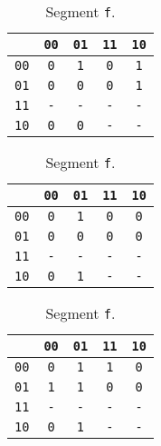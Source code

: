 \documentclass[10pt,a4paper]{article}
\newcommand{\f}[1]{\texttt{#1}}
\begin{document}
\begin{table}[!ht]
  \centering
  \begin{minipage}{0.3\linewidth}
    \centering
    \begin{tabular}{c|cccc}
             & \f{00} & \f{01} & \f{11} & \f{10} \\
      \midrule
      \f{00} &  \f{0} &  \f{1} &  \f{0} &  \f{1} \\
      \f{01} &  \f{0} &  \f{0} &  \f{0} &  \f{1} \\
      \f{11} &  \f{-} &  \f{-} &  \f{-} &  \f{-} \\
      \f{10} &  \f{0} &  \f{0} &  \f{-} &  \f{-} \\
    \end{tabular}
    \caption{Segment \f{d}.}
  \end{minipage}
  \quad
  \begin{minipage}{0.3\linewidth}
    \centering
    \begin{tabular}{c|cccc}
              & \f{00} & \f{01} & \f{11} & \f{10} \\
      \midrule
      \f{00} &  \f{0} &  \f{1} &  \f{0} &  \f{0} \\
      \f{01} &  \f{0} &  \f{0} &  \f{0} &  \f{0} \\
      \f{11} &  \f{-} &  \f{-} &  \f{-} &  \f{-} \\
      \f{10} &  \f{0} &  \f{1} &  \f{-} &  \f{-} \\
    \end{tabular}
    \caption{Segment \f{e}.}
  \end{minipage}
  \quad
  \begin{minipage}{0.3\linewidth}
    \centering
    \begin{tabular}{c|cccc}
             & \f{00} & \f{01} & \f{11} & \f{10} \\
      \midrule
      \f{00} &  \f{0} &  \f{1} &  \f{1} &  \f{0} \\
      \f{01} &  \f{1} &  \f{1} &  \f{0} &  \f{0} \\
      \f{11} &  \f{-} &  \f{-} &  \f{-} &  \f{-} \\
      \f{10} &  \f{0} &  \f{1} &  \f{-} &  \f{-} \\
    \end{tabular}
    \caption{Segment \f{f}.}
  \end{minipage}
\end{table}
\end{document}
